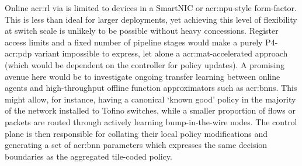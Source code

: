 


Online \gls{acr:rl} via \approachshort{} is limited to devices in a SmartNIC or \gls{acr:npu}-style form-factor.
This is less than ideal for larger deployments, yet achieving this level of flexibility at switch scale is unlikely to be possible without heavy concessions.
Register access limits and a fixed number of pipeline stages would make a purely P4-\gls{acr:pdp} variant impossible to express, let alone a \gls{acr:mat}-accelerated approach (which would be dependent on the controller for policy updates).
A promising avenue here would be to investigate ongoing transfer learning between online \approachshort{} agents and high-throughput offline function approximators such as \glspl{acr:bnn}.
This might allow, for instance, having a canonical `known good' policy in the majority of the network installed to Tofino switches, while a smaller proportion of flows or packets are routed through actively learning bump-in-the-wire nodes.
The control plane is then responsible for collating their local policy modifications and generating a set of \gls{acr:bnn} parameters which expresses the same decision boundaries as the aggregated tile-coded policy.


